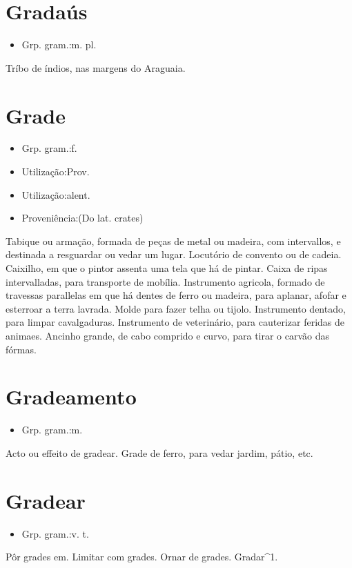 \section{Gradaús}
\begin{itemize}
\item {Grp. gram.:m. pl.}
\end{itemize}
Tríbo de índios, nas margens do Araguaia.
\section{Grade}
\begin{itemize}
\item {Grp. gram.:f.}
\end{itemize}
\begin{itemize}
\item {Utilização:Prov.}
\end{itemize}
\begin{itemize}
\item {Utilização:alent.}
\end{itemize}
\begin{itemize}
\item {Proveniência:(Do lat. \textunderscore crates\textunderscore )}
\end{itemize}
Tabique ou armação, formada de peças de metal ou madeira, com intervallos, e destinada a resguardar ou vedar um lugar.
Locutório de convento ou de cadeia.
Caixilho, em que o pintor assenta uma tela que há de pintar.
Caixa de ripas intervalladas, para transporte de mobília.
Instrumento agricola, formado de travessas parallelas em que há dentes de ferro ou madeira, para aplanar, afofar e esterroar a terra lavrada.
Molde para fazer telha ou tijolo.
Instrumento dentado, para limpar cavalgaduras.
Instrumento de veterinário, para cauterizar feridas de animaes.
Ancinho grande, de cabo comprido e curvo, para tirar o carvão das fórmas.
\section{Gradeamento}
\begin{itemize}
\item {Grp. gram.:m.}
\end{itemize}
Acto ou effeito de gradear.
Grade de ferro, para vedar jardim, pátio, etc.
\section{Gradear}
\begin{itemize}
\item {Grp. gram.:v. t.}
\end{itemize}
Pôr grades em.
Limitar com grades.
Ornar de grades.
Gradar^1.
